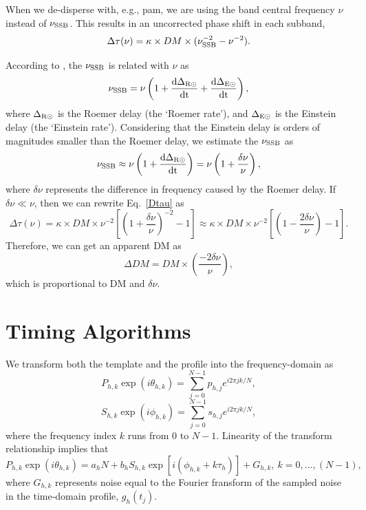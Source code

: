\documentclass[useAMS,usenatbib]{mn2e}
\begin{document}
\begin{appendix}
When we de-disperse with, e.g., pam, we are using the band central frequency $\nu$ 
instead of $\nu_{\rm{SSB}}$. This results in an uncorrected phase shift in each 
subband, 
%
\begin{equation}
\Delta\tau(\nu)=\kappa\times DM\times(\nu_{\rm{SSB}}^{-2}-\nu^{-2}).
\label{Dtau}
\end{equation}
%

According to \citet{Edwards06}, the $\nu_{\rm{SSB}}$ is 
related with $\nu$ as
%
\begin{equation}
\nu_{\rm{SSB}}=\nu\left(1+\frac{\rm{d}\Delta_{\rm{R\odot}}}{\rm{d}t}+\frac{\rm{d}\Delta_{\rm{E\odot}}}{\rm{d}t}\right),
\end{equation}
%
where $\Delta_{\rm{R\odot}}$ is the Roemer delay (the ‘Roemer rate’), and $\Delta_{\rm{E\odot}}$
is the Einstein delay (the ‘Einstein rate’). Considering that the Einstein delay is orders of 
magnitudes smaller than the Roemer delay, we estimate the $\nu_{\rm{SSB}}$ as
%
\begin{equation}
\nu_{\rm{SSB}}\approx\nu\left(1+\frac{\rm{d}\Delta_{\rm{R\odot}}}{\rm{d}t}\right)=\nu\left(1+\frac{\delta\nu}{\nu}\right),
\end{equation}
%
where $\delta\nu$ represents the difference in frequency caused by the Roemer delay. If 
$\delta\nu\ll\nu$, then we can rewrite Eq.~\ref{Dtau} as
%
\begin{equation}
\Delta\tau(\nu)=\kappa\times DM\times\nu^{-2}\left[\left(1+\frac{\delta\nu}{\nu}\right)^{-2}-1\right]\approx\kappa\times DM\times\nu^{-2}\left[\left(1-\frac{2\delta\nu}{\nu}\right)-1\right].
\end{equation}
%
Therefore, we can get an apparent DM as
\begin{equation}
\Delta DM=DM\times\left(\frac{-2\delta\nu}{\nu}\right),
\label{dDM}
\end{equation}
which is proportional to DM and $\delta\nu$.

\section{Timing Algorithms}

We transform both the template and the profile into the frequency-domain as
\begin{equation}
P_{h,k}\exp(i\theta_{h,k})=\sum_{j=0}^{N-1}p_{h,j}e^{i2\pi jk/N},
\end{equation}
\begin{equation}
S_{h,k}\exp(i\phi_{h,k})=\sum_{j=0}^{N-1}s_{h,j}e^{i2\pi jk/N},
\end{equation}
%
where the frequency index $k$ runs from 0 to $N-1$.
%
Linearity of the transform relationship implies that
%
\begin{equation}
\label{eq1}
P_{h,k}\exp(i\theta_{h,k})=a_{h}N+b_{h}S_{h,k}\exp[i(\phi_{h,k}+k\tau_{h})]+G_{h,k},
\ k=0,...,(N-1),
\end{equation}
%
where $G_{h,k}$ represents noise equal to the Fourier fransform of the sampled noise 
in the time-domain profile, $g_{h}(t_j)$.


\end{appendix}
\end{document}
